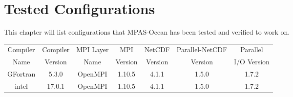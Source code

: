 \chapter{Tested Configurations}
\label{chap:tested-configurations}
This chapter will list configurations that MPAS-Ocean has been tested and verified to work on.

\begin{tabular}{| c | c | c | c | c | c | c |}
	\hline
	Compiler & Compiler & MPI Layer & MPI & NetCDF & Parallel-NetCDF & Parallel \\
	Name & Version & Name & Version & Version & Version & I/O Version \\
	\hline
	GFortran & 5.3.0 & OpenMPI & 1.10.5 & 4.1.1 & 1.5.0 & 1.7.2  \\
	\hline
	intel & 17.0.1 & OpenMPI & 1.10.5 & 4.1.1 & 1.5.0 & 1.7.2  \\
	\hline
\end{tabular}


